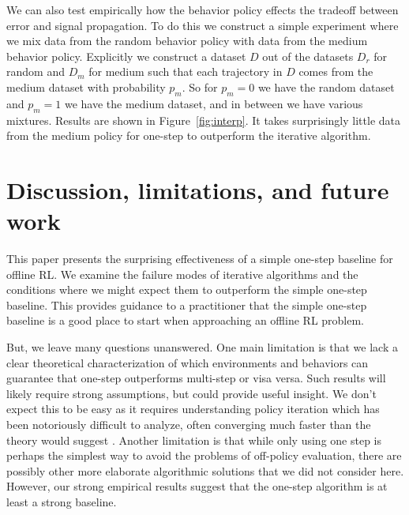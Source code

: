 We can also test empirically how the behavior policy effects the tradeoff between error and signal propagation. To do this we construct a simple experiment where we mix data from the random behavior policy with data from the medium behavior policy. Explicitly we construct a dataset $ D $ out of the datasets $ D_r$ for random and $ D_m$ for medium such that each trajectory in $ D $ comes from the medium dataset with probability $ p_m$. So for $ p_m = 0$ we have the random dataset and $ p_m = 1 $ we have the medium dataset, and in between we have various mixtures. Results are shown in Figure~\ref{fig:interp}. It takes surprisingly little data from the medium policy for one-step to outperform the iterative algorithm.



\section{Discussion, limitations, and future work}

This paper presents the surprising effectiveness of a simple one-step baseline for offline RL. We examine the failure modes of iterative algorithms and the conditions where we might expect them to outperform the simple one-step baseline. This provides guidance to a practitioner that the simple one-step baseline is a good place to start when approaching an offline RL problem.

But, we leave many questions unanswered.
One main limitation is that we lack a clear theoretical characterization of which environments and behaviors can guarantee that one-step outperforms multi-step or visa versa. Such results will likely require strong assumptions, but could provide useful insight. We don't expect this to be easy as it requires understanding policy iteration which has been notoriously difficult to analyze, often converging much faster than the theory would suggest \citep{sutton2018reinforcement, Agarwal2019ReinforcementLT}.
Another limitation is that while only using one step is perhaps the simplest way to avoid the problems of off-policy evaluation, there are possibly other more elaborate algorithmic solutions that we did not consider here. However, our strong empirical results suggest that the one-step algorithm is at least a strong baseline.


\printendnotes